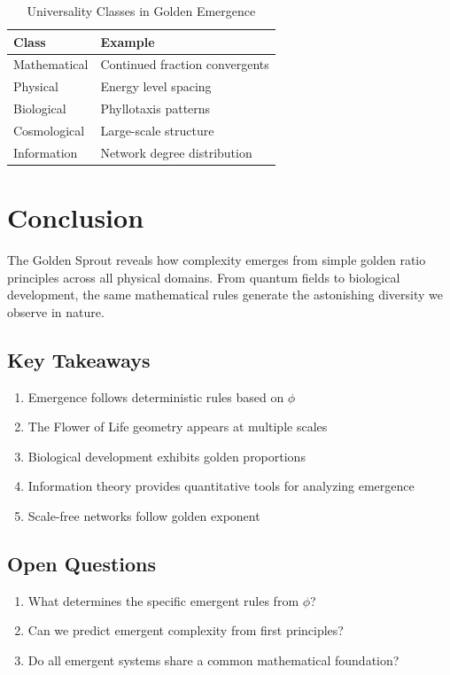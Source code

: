 \begin{table}[h]
\centering
\caption{Universality Classes in Golden Emergence}
\begin{tabular}{ll}
\toprule
Class & Example \\
\midrule
Mathematical & Continued fraction convergents \\
Physical & Energy level spacing \\
Biological & Phyllotaxis patterns \\
Cosmological & Large-scale structure \\
Information & Network degree distribution \\
\bottomrule
\end{tabular}
\end{table}

\section{Conclusion}

The Golden Sprout reveals how complexity emerges from simple golden ratio principles across all physical domains. From quantum fields to biological development, the same mathematical rules generate the astonishing diversity we observe in nature.

\subsection*{Key Takeaways}

\begin{enumerate}
    \item Emergence follows deterministic rules based on $\phi$
    \item The Flower of Life geometry appears at multiple scales
    \item Biological development exhibits golden proportions
    \item Information theory provides quantitative tools for analyzing emergence
    \item Scale-free networks follow golden exponent
\end{enumerate}

\subsection*{Open Questions}

\begin{enumerate}
    \item What determines the specific emergent rules from $\phi$?
    \item Can we predict emergent complexity from first principles?
    \item Do all emergent systems share a common mathematical foundation?
\end{enumerate}

